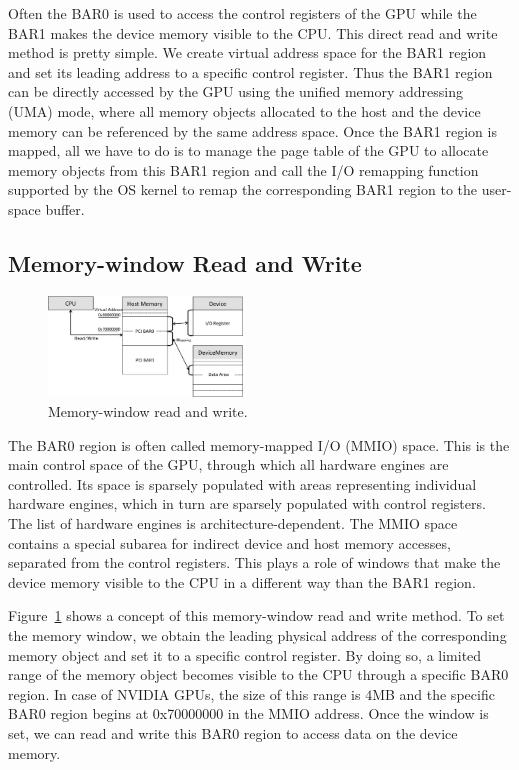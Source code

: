 Often the BAR0 is used to access the control registers of the GPU while
the BAR1 makes the device memory visible to the CPU.
This direct read and write method is pretty simple.
We create virtual address space for the BAR1 region and set its leading
address to a specific control register.
Thus the BAR1 region can be directly accessed by the GPU using the
unified memory addressing (UMA) mode, where all memory objects allocated
to the host and the device memory can be referenced by the same address
space.
Once the BAR1 region is mapped, all we have to do is to manage the page
table of the GPU to allocate memory objects from this BAR1 region and
call the I/O remapping function supported by the OS kernel to remap the
corresponding BAR1 region to the user-space buffer.

\subsection{Memory-window Read and Write}
\label{sec:memwnd}

\begin{figure}[!t]
 \centering
 \includegraphics[width=0.46\textwidth]{figure/Method/MEMWND_Method.pdf}
 \caption{Memory-window read and write.}
 \label{fig:memwnd}
\end{figure}

The BAR0 region is often called memory-mapped I/O (MMIO) space.
This is the main control space of the GPU, through which all hardware
engines are controlled.
Its space is sparsely populated with areas representing individual
hardware engines, which in turn are sparsely populated with control
registers.
The list of hardware engines is architecture-dependent.
The MMIO space contains a special subarea for indirect device and host
memory accesses, separated from the control registers.
This plays a role of windows that make the device memory visible to the
CPU in a different way than the BAR1 region.

Figure~\ref{fig:memwnd} shows a concept of this memory-window read and
write method.
To set the memory window, we obtain the leading physical address of the
corresponding memory object and set it to a specific control register.
By doing so, a limited range of the memory object becomes visible to the
CPU through a specific BAR0 region.
In case of NVIDIA GPUs, the size of this range is $4$MB and the specific
BAR0 region begins at 0x70000000 in the MMIO address.
Once the window is set, we can read and write this BAR0 region to access
data on the device memory.

